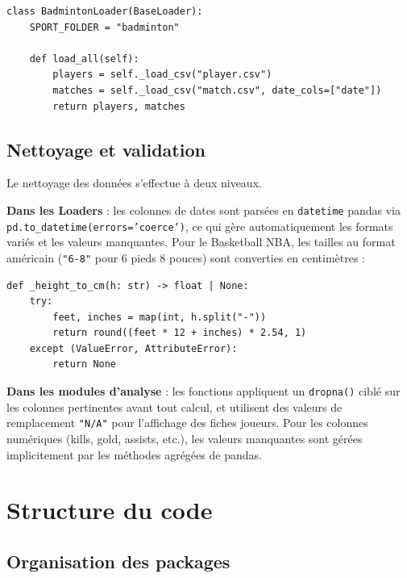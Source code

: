 \documentclass[12pt,a4paper]{article}
\newcommand{\code}[1]{\texttt{#1}}
\begin{document}
\begin{lstlisting}[caption={Structure minimale d'un loader (exemple Badminton)}]
class BadmintonLoader(BaseLoader):
    SPORT_FOLDER = "badminton"

    def load_all(self):
        players = self._load_csv("player.csv")
        matches = self._load_csv("match.csv", date_cols=["date"])
        return players, matches
\end{lstlisting}

\subsection{Nettoyage et validation}

Le nettoyage des données s'effectue à deux niveaux.

\textbf{Dans les Loaders} : les colonnes de dates sont parsées en \code{datetime} pandas
via \code{pd.to\_datetime(errors='coerce')}, ce qui gère automatiquement les formats
variés et les valeurs manquantes. Pour le Basketball NBA, les tailles au format américain
(\code{"6-8"} pour 6 pieds 8 pouces) sont converties en centimètres :

\begin{lstlisting}[caption={Conversion de taille NBA (BasketballLoader.py)}]
def _height_to_cm(h: str) -> float | None:
    try:
        feet, inches = map(int, h.split("-"))
        return round((feet * 12 + inches) * 2.54, 1)
    except (ValueError, AttributeError):
        return None
\end{lstlisting}

\textbf{Dans les modules d'analyse} : les fonctions appliquent un \code{dropna()} ciblé
sur les colonnes pertinentes avant tout calcul, et utilisent des valeurs de
remplacement \code{"N/A"} pour l'affichage des fiches joueurs. Pour les colonnes
numériques (kills, gold, assists, etc.), les valeurs manquantes sont gérées implicitement
par les méthodes agrégées de pandas.

\section{Structure du code}
\label{sec:structure}

\subsection{Organisation des packages}
\end{document}
